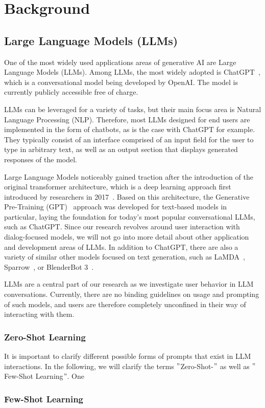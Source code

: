 \section{Background}
\label{sec:background}

\subsection{Large Language Models (LLMs)}
\label{subsec:large-language-models-(llms)}
One of the most widely used applications areas of generative AI are Large Language Models (LLMs).
Among LLMs, the most widely adopted is ChatGPT~\cite{openai_chatgpt_2023}, which is a
conversational model being developed by OpenAI\@.
The model is currently publicly accessible free of charge.

LLMs can be leveraged for a variety of tasks, but their main focus area is Natural Language Processing
(NLP).
Therefore, most LLMs designed for end users are implemented in the form of chatbots,
as is the case with ChatGPT for example.
They typically consist of an interface comprised of an input field for the user to type in arbitrary
text, as well as an output section that displays generated responses of the model.

Large Language Models noticeably gained traction after the introduction of the original transformer
architecture, which is a deep learning approach first introduced by researchers in 2017~\cite{vaswani_attention_2017}.
Based on this architecture, the Generative Pre-Training (GPT)~\cite{radford_improving_2018} approach
was developed for text-based models in particular, laying the foundation for today's most popular
conversational LLMs, such as ChatGPT\@.
Since our research revolves around user interaction with dialog-focused models, we will not go into
more detail about other application and development areas of LLMs.
In addition to ChatGPT, there are also a variety of similar other models focused on text generation,
such as LaMDA~\cite{thoppilan_lamda_2022}, Sparrow~\cite{glaese_improving_2022}, or
BlenderBot 3~\cite{shuster_blenderbot_2022}.


LLMs are a central part of our research as we investigate user behavior in LLM conversations.
Currently, there are no binding guidelines on usage and prompting of such models,
and users are therefore completely unconfined in their way of interacting with them.


\subsubsection{Zero-Shot Learning}
It is important to clarify different possible forms of prompts that exist in LLM interactions.
In the following, we will clarify the terms \("\)Zero-Shot-\("\) as well as \("\)Few-Shot Learning\("\).
One
\subsubsection{Few-Shot Learning}
